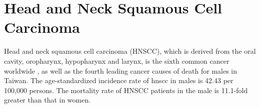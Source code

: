 \documentclass[12pt, a4paper]{article}
\begin{document}









\section{Head and Neck Squamous Cell Carcinoma}
\label{sec:section}

Head and neck squamous cell carcinoma (HNSCC), which is derived from the oral cavity, oropharynx, hypopharynx and larynx, is the sixth common cancer worldwide \citep{Siegel2016}, as well as the fourth leading cancer causes of death for males in Taiwan\citep{MOHW_death2017}. The age-standardized incidence rate of \acrshort{hnscc} in males is 42.43 per 100,000 persons\citep{MOHW_incidence2018}. The mortality rate of HNSCC patients in the male is 11.1-fold greater than that in women.


\end{document}
